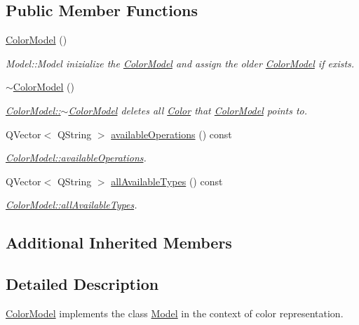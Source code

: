 \subsection*{Public Member Functions}
\begin{DoxyCompactItemize}
\item 
\hyperlink{class_color_model_a2c2ee4adfbff8d5d5c9f7dc6fb7e9f3f}{Color\+Model} ()
\begin{DoxyCompactList}\small\item\em Model\+::\+Model inizialize the \hyperlink{class_color_model}{Color\+Model} and assign the older \hyperlink{class_color_model}{Color\+Model} if exists. \end{DoxyCompactList}\item 
\mbox{\label{class_color_model_ace1f2efdd5fd223daa7e9cf002556a04}} 
\hyperlink{class_color_model_ace1f2efdd5fd223daa7e9cf002556a04}{$\sim$\+Color\+Model} ()
\begin{DoxyCompactList}\small\item\em \hyperlink{class_color_model_ace1f2efdd5fd223daa7e9cf002556a04}{Color\+Model\+::$\sim$\+Color\+Model} deletes all \hyperlink{class_color}{Color} that \hyperlink{class_color_model}{Color\+Model} points to. \end{DoxyCompactList}\item 
Q\+Vector$<$ Q\+String $>$ \hyperlink{class_color_model_aab6a725338946ecec218220f5606be45}{available\+Operations} () const
\begin{DoxyCompactList}\small\item\em \hyperlink{class_color_model_aab6a725338946ecec218220f5606be45}{Color\+Model\+::available\+Operations}. \end{DoxyCompactList}\item 
Q\+Vector$<$ Q\+String $>$ \hyperlink{class_color_model_ac1788de4bf589070a2e915ff43d073ad}{all\+Available\+Types} () const
\begin{DoxyCompactList}\small\item\em \hyperlink{class_color_model_ac1788de4bf589070a2e915ff43d073ad}{Color\+Model\+::all\+Available\+Types}. \end{DoxyCompactList}\end{DoxyCompactItemize}
\subsection*{Additional Inherited Members}


\subsection{Detailed Description}
\hyperlink{class_color_model}{Color\+Model} implements the class \hyperlink{class_model}{Model} in the context of color representation. 


